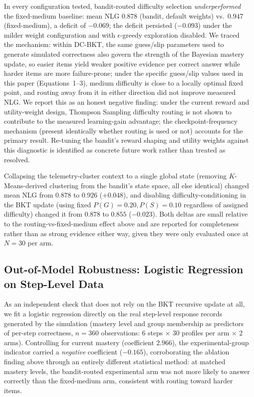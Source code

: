 \documentclass[notitlepage,12pt]{jedm}
\begin{document}
In every configuration tested, bandit-routed difficulty selection \emph{underperformed} the fixed-medium baseline: mean NLG $0.878$ (bandit, default weights) vs.\ $0.947$ (fixed-medium), a deficit of $-0.069$; the deficit persisted ($-0.093$) under the milder weight configuration and with $\epsilon$-greedy exploration disabled. We traced the mechanism: within DC-BKT, the same guess/slip parameters used to generate simulated correctness also govern the strength of the Bayesian mastery update, so easier items yield weaker positive evidence per correct answer while harder items are more failure-prone; under the specific guess/slip values used in this paper (Equations~1--3), medium difficulty is close to a locally optimal fixed point, and routing away from it in either direction did not improve measured NLG. We report this as an honest negative finding: under the current reward and utility-weight design, Thompson Sampling difficulty routing is not shown to contribute to the measured learning-gain advantage; the checkpoint-frequency mechanism (present identically whether routing is used or not) accounts for the primary result. Re-tuning the bandit's reward shaping and utility weights against this diagnostic is identified as concrete future work rather than treated as resolved.

Collapsing the telemetry-cluster context to a single global state (removing $K$-Means-derived clustering from the bandit's state space, all else identical) changed mean NLG from $0.878$ to $0.926$ ($+0.048$), and disabling difficulty-conditioning in the BKT update (using fixed $P(G)=0.20, P(S)=0.10$ regardless of assigned difficulty) changed it from $0.878$ to $0.855$ ($-0.023$). Both deltas are small relative to the routing-vs-fixed-medium effect above and are reported for completeness rather than as strong evidence either way, given they were only evaluated once at $N=30$ per arm.

\subsection{Out-of-Model Robustness: Logistic Regression on Step-Level Data}
As an independent check that does not rely on the BKT recursive update at all, we fit a logistic regression directly on the real step-level response records generated by the simulation (mastery level and group membership as predictors of per-step correctness, $n=360$ observations: 6 steps $\times$ 30 profiles per arm $\times$ 2 arms). Controlling for current mastery (coefficient $2.966$), the experimental-group indicator carried a \emph{negative} coefficient ($-0.165$), corroborating the ablation finding above through an entirely different statistical method: at matched mastery levels, the bandit-routed experimental arm was not more likely to answer correctly than the fixed-medium arm, consistent with routing toward harder items.
\end{document}
